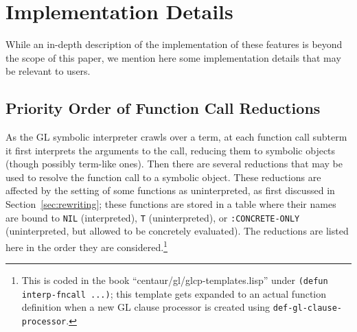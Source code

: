 \documentclass[submission,copyright,creativecommons]{eptcs}
\begin{document}
\section{Implementation Details}
\label{sec:details}


While an in-depth description of the implementation of these features
is beyond the scope of this paper, we mention here some implementation
details that may be relevant to users.

\subsection{Priority Order of Function Call Reductions}
As the GL symbolic interpreter crawls over a term, at each function
call subterm it first interprets the arguments to the call, reducing
them to symbolic objects (though possibly term-like ones).  Then there
are several reductions that may be used to resolve the function call
to a symbolic object.  These reductions are affected by the setting of
some functions as uninterpreted, as first discussed in
Section~\ref{sec:rewriting}; these functions are stored in a table
where their names are bound to \texttt{NIL} (interpreted),
\texttt{T} (uninterpreted), or \texttt{:CONCRETE-ONLY} (uninterpreted,
but allowed to be concretely evaluated).  The reductions are listed
here in the order they are considered.\footnote{This is coded in the
  book ``centaur/gl/glcp-templates.lisp'' under \texttt{(defun
    interp-fncall ...)}; this template gets expanded to an actual
  function definition when a new GL clause processor is created using
  \texttt{def-gl-clause-processor}.}
\end{document}
